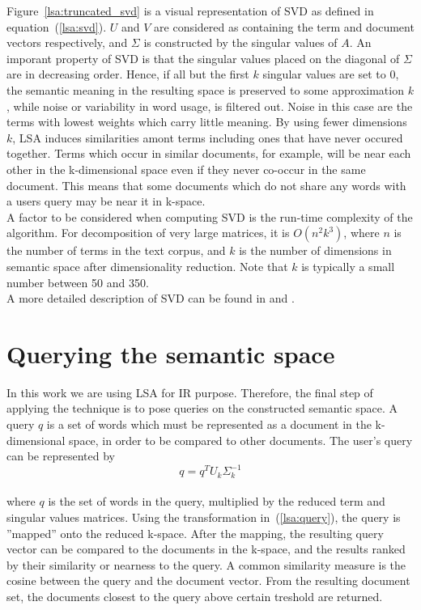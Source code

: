 Figure~\ref{lsa:truncated_svd} is a visual representation of \gls{SVD} as defined in equation~(\ref{lsa:svd}). $U$ and $V$ are considered as containing the term and document vectors respectively, and $\Sigma$ is constructed by the singular values of $A$. An imporant property of \gls{SVD} is that the singular values placed on the diagonal of $\Sigma$ are in decreasing order. Hence, if all but the first $k$ singular values are set to $0$, the semantic meaning in the resulting space is preserved to some approximation $k$, while noise or variability in word usage, is filtered out. Noise in this case are the terms with lowest weights which carry little meaning. By using fewer dimensions $k$, \gls{LSA} induces similarities amont terms including ones that have never occured together. Terms which occur in similar documents, for example, will be near each other in the k-dimensional space even if they never co-occur in the same document. This means that some documents which do not share any words with a users query may be near it in k-space.\\

A factor to be considered when computing \gls{SVD} is the run-time complexity of the algorithm. For decomposition of very large matrices, it is $O(n^2k^3)$, where $n$ is the number of terms in the text corpus, and $k$ is the number of dimensions in semantic space after dimensionality reduction. Note that $k$ is typically a small number between 50 and 350.\\

A more detailed description of \gls{SVD} can be found in \cite{Berry95usinglinear} and \cite{MatrixCompGolub96}.\\

\section{Querying the semantic space}
\label{lsa:querying_sspace}

In this work we are using \gls{LSA} for \gls{IR} purpose. Therefore, the final step of applying the technique is to pose queries on the constructed semantic space. A query $q$ is a set of words which must be represented as a document in the k-dimensional space, in order to be compared to other documents. The user's query can be represented by
%
%
\begin{equation}
\label{lsa:query}
q = q^{T}U_{k}\Sigma_{k}^{-1}
\end{equation}\\
where $q$ is the set of words in the query, multiplied by the reduced term and singular values matrices. Using the transformation in~(\ref{lsa:query}), the query is ''mapped'' onto the reduced k-space. After the mapping, the resulting query vector can be compared to the documents in the k-space, and the results ranked by their similarity or nearness to the query. A common similarity measure is the cosine between the query and the document vector. From the resulting document set, the documents closest to the query above certain treshold are returned. \\

